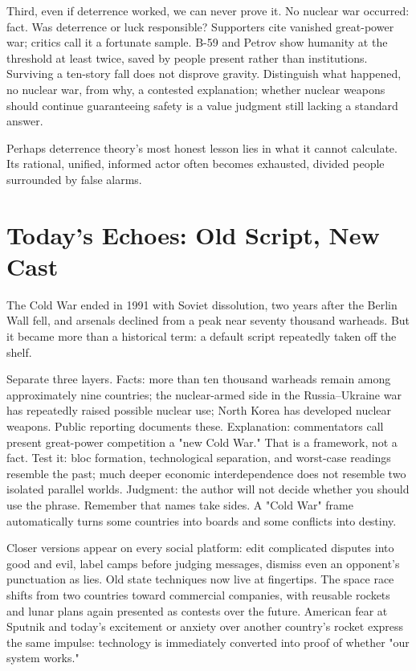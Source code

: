 Third, even if deterrence worked, we can never prove it. No nuclear war occurred: fact. Was deterrence or luck responsible? Supporters cite vanished great-power war; critics call it a fortunate sample. B-59 and Petrov show humanity at the threshold at least twice, saved by people present rather than institutions. Surviving a ten-story fall does not disprove gravity. Distinguish what happened, no nuclear war, from why, a contested explanation; whether nuclear weapons should continue guaranteeing safety is a value judgment still lacking a standard answer.

Perhaps deterrence theory's most honest lesson lies in what it cannot calculate. Its rational, unified, informed actor often becomes exhausted, divided people surrounded by false alarms.

\section{Today's Echoes: Old Script, New Cast}
The Cold War ended in 1991 with Soviet dissolution, two years after the Berlin Wall fell, and arsenals declined from a peak near seventy thousand warheads. But it became more than a historical term: a default script repeatedly taken off the shelf.

Separate three layers. Facts: more than ten thousand warheads remain among approximately nine countries; the nuclear-armed side in the Russia--Ukraine war has repeatedly raised possible nuclear use; North Korea has developed nuclear weapons. Public reporting documents these. Explanation: commentators call present great-power competition a "new Cold War." That is a framework, not a fact. Test it: bloc formation, technological separation, and worst-case readings resemble the past; much deeper economic interdependence does not resemble two isolated parallel worlds. Judgment: the author will not decide whether you should use the phrase. Remember that names take sides. A "Cold War" frame automatically turns some countries into boards and some conflicts into destiny.

Closer versions appear on every social platform: edit complicated disputes into good and evil, label camps before judging messages, dismiss even an opponent's punctuation as lies. Old state techniques now live at fingertips. The space race shifts from two countries toward commercial companies, with reusable rockets and lunar plans again presented as contests over the future. American fear at Sputnik and today's excitement or anxiety over another country's rocket express the same impulse: technology is immediately converted into proof of whether "our system works."

